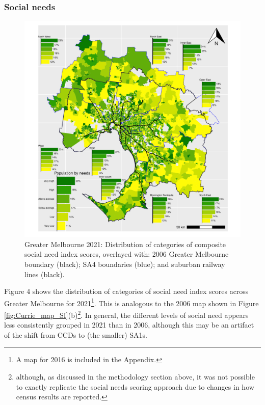 \documentclass[preprint, 3p,
authoryear]{elsarticle} %
\begin{document}
\subsubsection{Social needs}\label{social-needs}

\begin{figure}
\centering
\includegraphics{ReynoldsCurrieQu2024_files/figure-latex/Greater_Melbourne_2021_social_needs-1.pdf}
\caption{Greater Melbourne 2021: Distribution of categories of composite
social need index scores, overlayed with: 2006 Greater Melbourne
boundary (black); SA4 boundaries (blue); and suburban railway lines
(black).}
\end{figure}

Figure 4 shows the distribution of categories of social need index
scores across Greater Melbourne for 2021\footnote{A map for 2016 is
  included in the Appendix.}. This is analogous to the 2006 map shown in
Figure \ref{fig:Currie_map_SI}(b)\footnote{although, as discussed in the
  methodology section above, it was not possible to exactly replicate
  the \citet{currie2010identifying} social needs scoring approach due to
  changes in how census results are reported.}. In general, the
different levels of social need appears less consistently grouped in
2021 than in 2006, although this may be an artifact of the shift from
CCDs to (the smaller) SA1s.
\end{document}

